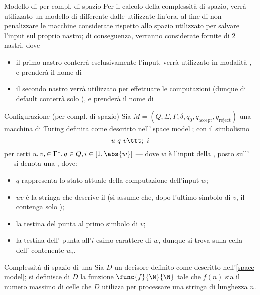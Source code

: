 \documentclass[a4paper, 12pt]{report}
\begin{document}
    \begin{framedobs}[label={space model}]{Modello di \TM per compl. di spazio}
        Per il calcolo della complessità di spazio, verrà utilizzato un modello di \TM differente dalle \TM utilizzate fin'ora, al fine di non penalizzare le macchine considerate rispetto allo spazio utilizzato per salvare l'input sul proprio nastro; di conseguenza, verranno considerate \TM fornite di 2 nastri, dove

        \begin{itemize}
            \item il primo nastro conterrà esclusivamente l'input, verrà utilizzato in modalità , e prenderà il nome di 
            \item il secondo nastro verrà utilizzato per effettuare le computazioni (dunque di default conterrà solo \blankchar), e prenderà il nome di 
        \end{itemize}
    \end{framedobs}

    \begin{frameddefn}[breakable]{Configurazione (\TM per compl. di spazio)}
        Sia $M = (Q, \Sigma, \Gamma, \delta, q_0, q_\mathrm{accept}, q_\mathrm{reject})$ una macchina di Turing definita come descritto nell'\cref{space model}; con il simbolismo $$u \ q \ v \ttt ; \ i$$ per certi $u, v, \in \Gamma^*, q \in Q, i \in [1, \abs{w}]$ --- dove $w$ è l'input della \TM, posto sull' --- si denota una , dove:

        \begin{itemize}
            \item $q$ rappresenta lo stato attuale della computazione dell'input $w$;
            \item $uv$ è la stringa che descrive il  (si assume che, dopo l'ultimo simbolo di $v$, il  contenga solo \blankchar);
            \item la testina del  punta al primo simbolo di $v$;
            \item la testina dell' punta all'$i$-esimo carattere di $w$, dunque si trova sulla cella dell' contenente $w_i$.
        \end{itemize}
    \end{frameddefn}

    \begin{frameddefn}[label={space complexity}]{Complessità di spazio di una \TM}
        Sia $D$ un decisore definito come descritto nell'\cref{space model}; si definisce  di $D$ la funzione $\func{f}{\N}{\N}$ tale che $f(n)$ sia il numero massimo di celle che $D$ utilizza per processare una stringa di lunghezza $n$.
    \end{frameddefn}
\end{document}
